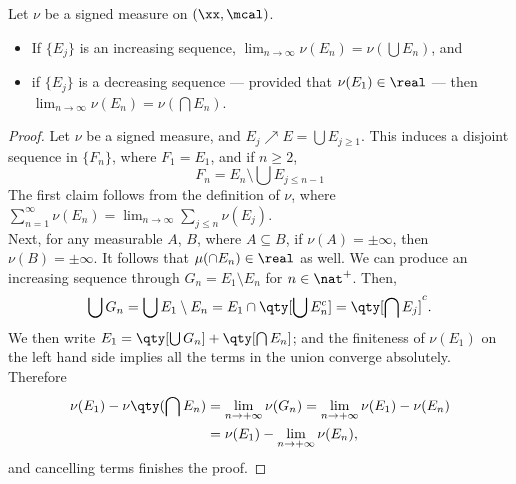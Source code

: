 \documentclass[../../main.tex]{subfiles}
\begin{document}
\providecommand{\fn}{\{F_n\}}
\begin{wts}
    Let $\nu$ be a signed measure on $(\xx,\mcal)$. 
    \begin{itemize}
        \item If $\{E_j\}$ is an increasing sequence, $\lim_{n\to\infty}\nu(E_n) = \nu(\bigcup E_n)$, and
        \item if $\{E_j\}$ is a decreasing sequence --- provided that $\nu(E_1)\in\real$ --- then $\lim_{n\to\infty}\nu(E_n) = \nu(\bigcap E_n)$.
    \end{itemize}
\end{wts}
\begin{proof}
    Let $\nu$ be a signed measure, and $E_j\nearrow E=\bigcup E_{j\geq 1}$. This induces a disjoint sequence in $\{F_n\}$, where $F_1 = E_1$, and if $n\geq 2$,
    \[F_n = E_n\setminus\bigcup E_{j\leq n-1}\]
    The first claim follows from the definition of $\nu$, where $\sum_{n=1}^{\infty}\nu(E_n) = \lim_{n\to\infty}\sum_{j\leq n}\nu(E_j)$.\\

    Next, for any measurable $A$, $B$, where $A\subseteq B$, if $\nu(A)=\pm\infty$, then $\nu(B)=\pm\infty$. It follows that $\mu(\cap E_n)\in\real$ as well. We can produce an increasing sequence through $G_n = E_1\setminus E_n$ for $n\in\nat^+$. Then,
    \[
        \bigcup G_n = \bigcup E_1\setminus E_n = E_1\cap\qty[\bigcup E_n^c]=\qty[\bigcap E_j]^c.
    \]
    We then write $E_1 = \qty[\bigcup G_n] + \qty[\bigcap E_n]$; and the finiteness of $\nu(E_1)$ on the left hand side implies all the terms in the union converge absolutely. Therefore
    \begin{align*}
            \nu(E_1) - \nu\qty(\bigcap E_n) &= \lim_{n\to+\infty} \nu(G_n) = \lim_{n\to+\infty}\nu(E_1) - \nu(E_n)\\
            &= \nu(E_1) - \lim_{n\to+\infty}\nu(E_n),
    \end{align*}
    and cancelling terms finishes the proof.
\end{proof}
\end{document}

